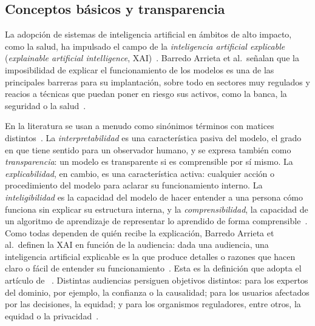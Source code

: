 \subsection{Conceptos básicos y transparencia}\label{sec:ea-xai-conceptos}

La adopción de sistemas de inteligencia artificial en ámbitos de alto impacto,
como la salud, ha impulsado el campo de la \emph{inteligencia artificial
explicable} (\emph{explainable artificial intelligence},
XAI)~\cite{sevillano2025tesis}. Barredo Arrieta et al.\ señalan que la
imposibilidad de explicar el funcionamiento de los modelos es una de las
principales barreras para su implantación, sobre todo en sectores muy regulados y
reacios a técnicas que puedan poner en riesgo sus activos, como la banca, la
seguridad o la salud~\cite{barredo2020}. 
%

En la literatura se usan a menudo como sinónimos términos con matices
distintos~\cite{barredo2020}. La \emph{interpretabilidad} es una característica
pasiva del modelo, el grado en que tiene sentido para un observador humano, y se
expresa también como \emph{transparencia}: un modelo es transparente si es
comprensible por sí mismo. La \emph{explicabilidad}, en cambio, es una
característica activa: cualquier acción o procedimiento del modelo para aclarar
su funcionamiento interno. La \emph{inteligibilidad} es la capacidad del modelo de
hacer entender a una persona cómo funciona sin explicar su estructura interna, y
la \emph{comprensibilidad}, la capacidad de un algoritmo de aprendizaje de
representar lo aprendido de forma comprensible~\cite{barredo2020}. Como todas
dependen de quién recibe la explicación, Barredo Arrieta et al.\ definen la XAI
en función de la audiencia: dada una audiencia, una inteligencia artificial
explicable es la que produce detalles o razones que hacen claro o fácil de
entender su funcionamiento~\cite{barredo2020}. Esta es la definición que adopta
el artículo de \stoodx~\cite{sevillano2026}. Distintas audiencias persiguen
objetivos distintos: para los expertos del dominio, por ejemplo, la confianza o
la causalidad; para los usuarios afectados por las decisiones, la equidad; y para
los organismos reguladores, entre otros, la equidad o la
privacidad~\cite{barredo2020}.

